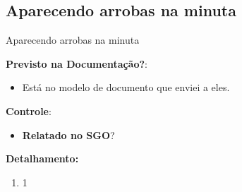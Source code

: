 \subsection{Aparecendo arrobas na minuta}
\begin{falha}[1]{Aparecendo arrobas na minuta}
	
	
	\textbf{Previsto na Documentação?}: \mschecksim
	\begin{itemize}
		\item Está no modelo de documento que enviei a eles.
	\end{itemize}
	
	\textbf{Controle}:
	\begin{itemize}
		\item \textbf{Relatado no SGO}? \mschecksim 
	\end{itemize}
	
	
	\tcblower
	
	\textbf{Detalhamento:}
	\begin{enumerate}
		\item 1
	\end{enumerate}
	
\end{falha}


